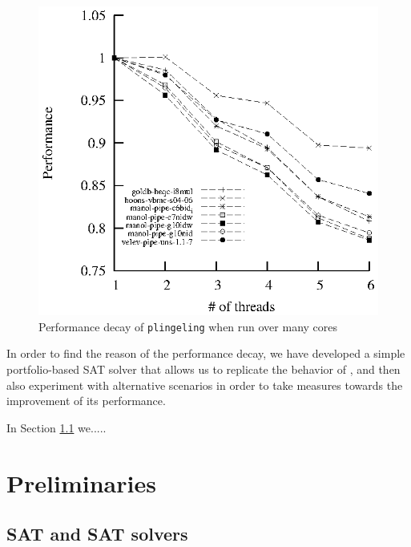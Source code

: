\documentclass{llncs}
\begin{document}
\begin{figure}[tp]
  \centering
  \includegraphics[scale=1]{plingeling_6cores_speedup}
  \caption{Performance decay of {\tt plingeling} when run over many cores}
  \label{fig:decay}
\end{figure}

In order to find the reason of the performance decay, we have
developed a simple portfolio-based SAT solver that allows us to
replicate the behavior of \pling, and then also experiment with
alternative scenarios in order to take measures towards the
improvement of its performance.

In Section \ref{} we.....

\section{Preliminaries}
\label{sec:preliminaries}
\subsection{SAT and SAT solvers}
\end{document}
